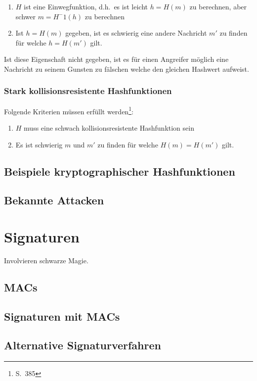 \begin{enumerate}
\item $H$ ist eine Einwegfunktion, d.h.~es ist leicht $h = H(m)$ zu
  berechnen, aber schwer $m = H^-1(h)$ zu berechnen
\item Ist $h = H(m)$ gegeben, ist es schwierig eine andere Nachricht
  $m'$ zu finden für welche $h = H(m')$ gilt.
\end{enumerate}

Ist diese Eigenschaft nicht gegeben, ist es für einen Angreifer
möglich eine Nachricht zu seinem Gunsten zu fälschen welche den
gleichen Hashwert aufweist.

\subsection{Stark kollisionsresistente Hashfunktionen}

Folgende Kriterien müssen erfüllt werden\footnote{S.~385}:

\begin{enumerate}
\item $H$ muss eine schwach kollisionsresistente Hashfunktion sein
\item Es ist schwierig $m$ und $m'$ zu finden für welche $H(m) =
  H(m')$ gilt.
\end{enumerate}

\section{Beispiele kryptographischer Hashfunktionen}

\section{Bekannte Attacken}

\author{Autor: Vasilij Schneidermann}
\chapter{Signaturen}

Involvieren schwarze Magie.

\section{\ac{MAC}s}

\section{Signaturen mit \ac{MAC}s}

\section{Alternative Signaturverfahren}
